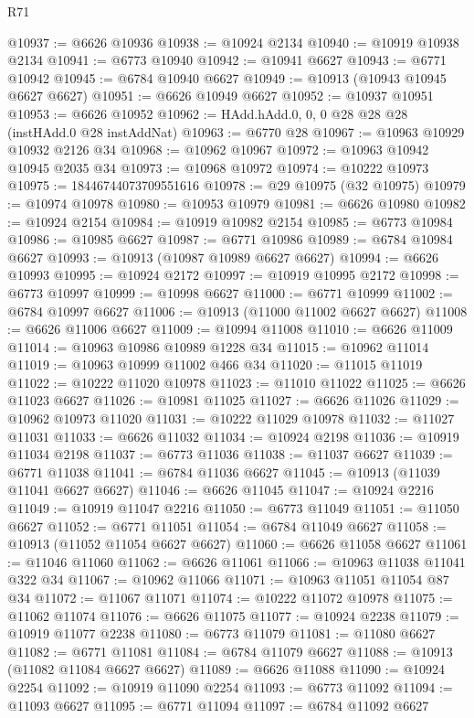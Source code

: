 \begin{lexlean}{R71}
\begin{coremodule}
@10937 := @6626 @10936
@10938 := @10924 @2134
@10940 := @10919 @10938 @2134
@10941 := @6773 @10940
@10942 := @10941 @6627
@10943 := @6771 @10942
@10945 := @6784 @10940 @6627
@10949 := @10913 (@10943 @10945 @6627 @6627)
@10951 := @6626 @10949 @6627
@10952 := @10937 @10951
@10953 := @6626 @10952
@10962 := HAdd.hAdd.{0, 0, 0} @28 @28 @28 (instHAdd.{0} @28 instAddNat)
@10963 := @6770 @28
@10967 := @10963 @10929 @10932 @2126 @34
@10968 := @10962 @10967
@10972 := @10963 @10942 @10945 @2035 @34
@10973 := @10968 @10972
@10974 := @10222 @10973
@10975 := 18446744073709551616
@10978 := @29 @10975 (@32 @10975)
@10979 := @10974 @10978
@10980 := @10953 @10979
@10981 := @6626 @10980
@10982 := @10924 @2154
@10984 := @10919 @10982 @2154
@10985 := @6773 @10984
@10986 := @10985 @6627
@10987 := @6771 @10986
@10989 := @6784 @10984 @6627
@10993 := @10913 (@10987 @10989 @6627 @6627)
@10994 := @6626 @10993
@10995 := @10924 @2172
@10997 := @10919 @10995 @2172
@10998 := @6773 @10997
@10999 := @10998 @6627
@11000 := @6771 @10999
@11002 := @6784 @10997 @6627
@11006 := @10913 (@11000 @11002 @6627 @6627)
@11008 := @6626 @11006 @6627
@11009 := @10994 @11008
@11010 := @6626 @11009
@11014 := @10963 @10986 @10989 @1228 @34
@11015 := @10962 @11014
@11019 := @10963 @10999 @11002 @466 @34
@11020 := @11015 @11019
@11022 := @10222 @11020 @10978
@11023 := @11010 @11022
@11025 := @6626 @11023 @6627
@11026 := @10981 @11025
@11027 := @6626 @11026
@11029 := @10962 @10973 @11020
@11031 := @10222 @11029 @10978
@11032 := @11027 @11031
@11033 := @6626 @11032
@11034 := @10924 @2198
@11036 := @10919 @11034 @2198
@11037 := @6773 @11036
@11038 := @11037 @6627
@11039 := @6771 @11038
@11041 := @6784 @11036 @6627
@11045 := @10913 (@11039 @11041 @6627 @6627)
@11046 := @6626 @11045
@11047 := @10924 @2216
@11049 := @10919 @11047 @2216
@11050 := @6773 @11049
@11051 := @11050 @6627
@11052 := @6771 @11051
@11054 := @6784 @11049 @6627
@11058 := @10913 (@11052 @11054 @6627 @6627)
@11060 := @6626 @11058 @6627
@11061 := @11046 @11060
@11062 := @6626 @11061
@11066 := @10963 @11038 @11041 @322 @34
@11067 := @10962 @11066
@11071 := @10963 @11051 @11054 @87 @34
@11072 := @11067 @11071
@11074 := @10222 @11072 @10978
@11075 := @11062 @11074
@11076 := @6626 @11075
@11077 := @10924 @2238
@11079 := @10919 @11077 @2238
@11080 := @6773 @11079
@11081 := @11080 @6627
@11082 := @6771 @11081
@11084 := @6784 @11079 @6627
@11088 := @10913 (@11082 @11084 @6627 @6627)
@11089 := @6626 @11088
@11090 := @10924 @2254
@11092 := @10919 @11090 @2254
@11093 := @6773 @11092
@11094 := @11093 @6627
@11095 := @6771 @11094
@11097 := @6784 @11092 @6627

\end{coremodule}
\end{lexlean}
